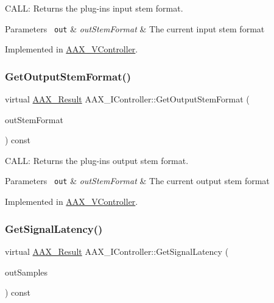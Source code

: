 C\+A\+LL\+: Returns the plug-\/in\textquotesingle{}s input stem format. 


\begin{DoxyParams}[1]{Parameters}
\mbox{\texttt{ out}}  & {\em out\+Stem\+Format} & The current input stem format \\
\hline
\end{DoxyParams}


Implemented in \mbox{\hyperlink{a01905_a58e102ae406dd0fbf022d4364e6e24d0}{A\+A\+X\+\_\+\+V\+Controller}}.

\mbox{\label{a01789_aabe72e915df571776d4aa1c36ef8d6f2}} 
\subsubsection{\texorpdfstring{GetOutputStemFormat()}{GetOutputStemFormat()}}
{\footnotesize\ttfamily virtual \mbox{\hyperlink{a00392_a4d8f69a697df7f70c3a8e9b8ee130d2f}{A\+A\+X\+\_\+\+Result}} A\+A\+X\+\_\+\+I\+Controller\+::\+Get\+Output\+Stem\+Format (\begin{DoxyParamCaption}\item[{\mbox{\hyperlink{a00491_ad8af5ef008b2bd478add9a0acb0a1d85}{A\+A\+X\+\_\+\+E\+Stem\+Format}} $\ast$}]{out\+Stem\+Format }\end{DoxyParamCaption}) const\hspace{0.3cm}{\ttfamily [pure virtual]}}



C\+A\+LL\+: Returns the plug-\/in\textquotesingle{}s output stem format. 


\begin{DoxyParams}[1]{Parameters}
\mbox{\texttt{ out}}  & {\em out\+Stem\+Format} & The current output stem format \\
\hline
\end{DoxyParams}


Implemented in \mbox{\hyperlink{a01905_a01a96e488251716cfc236551b9f9a2fb}{A\+A\+X\+\_\+\+V\+Controller}}.

\mbox{\label{a01789_ad50aa6fd54e39623a58debd63d9551e1}} 
\subsubsection{\texorpdfstring{GetSignalLatency()}{GetSignalLatency()}}
{\footnotesize\ttfamily virtual \mbox{\hyperlink{a00392_a4d8f69a697df7f70c3a8e9b8ee130d2f}{A\+A\+X\+\_\+\+Result}} A\+A\+X\+\_\+\+I\+Controller\+::\+Get\+Signal\+Latency (\begin{DoxyParamCaption}\item[{int32\+\_\+t $\ast$}]{out\+Samples }\end{DoxyParamCaption}) const\hspace{0.3cm}{\ttfamily [pure virtual]}}



